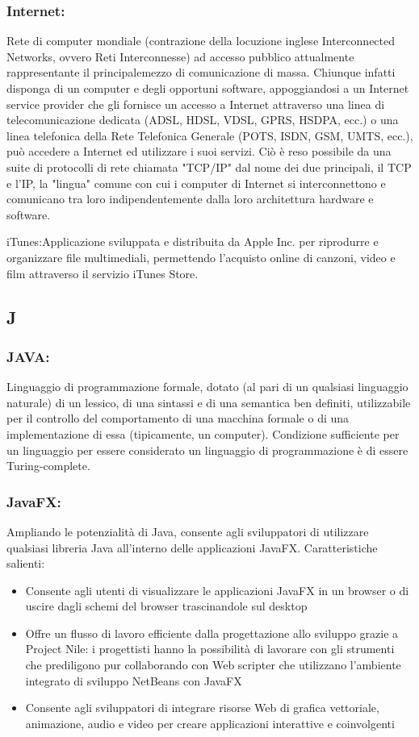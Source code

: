 \subsubsection*{Internet:}  Rete di computer mondiale (contrazione della
locuzione inglese Interconnected Networks, ovvero Reti Interconnesse) ad accesso pubblico
attualmente rappresentante il principalemezzo di comunicazione di massa.
Chiunque infatti disponga di un computer e degli opportuni software,
appoggiandosi a un Internet service provider che gli fornisce un accesso a
Internet attraverso una linea di telecomunicazione dedicata (ADSL, HDSL, VDSL,
GPRS, HSDPA, ecc.) o una linea telefonica della Rete Telefonica Generale (POTS,
ISDN, GSM, UMTS, ecc.), pu\`o accedere a Internet ed utilizzare i suoi servizi.
Ci\`o \`e reso possibile da una suite di protocolli di rete chiamata "TCP/IP" dal
nome dei due principali, il TCP e l'IP, la "lingua" comune con cui i computer di
Internet si interconnettono e comunicano tra loro indipendentemente dalla loro
architettura hardware e software.

iTunes:Applicazione sviluppata e distribuita da Apple Inc. per riprodurre e
organizzare file multimediali, permettendo l'acquisto online di canzoni, video e
film attraverso il servizio iTunes Store.

\subsection*{\huge{J}}
\subsubsection*{JAVA:} Linguaggio di programmazione formale, dotato (al pari di
un qualsiasi linguaggio naturale) di un lessico, di una sintassi e di una semantica ben
definiti, utilizzabile per il controllo del comportamento di una macchina
formale o di una implementazione di essa (tipicamente, un computer). Condizione
sufficiente per un linguaggio per essere considerato un linguaggio di
programmazione \`e di essere Turing-complete.

\subsubsection*{JavaFX:} Ampliando le potenzialit\`a di Java, consente agli
sviluppatori di utilizzare qualsiasi libreria Java all'interno delle applicazioni JavaFX.
Caratteristiche salienti:
\begin{itemize}
\item Consente agli utenti di visualizzare le applicazioni JavaFX in un browser
o di uscire dagli schemi del browser trascinandole sul desktop 
\item Offre un flusso di lavoro efficiente dalla progettazione allo sviluppo
grazie a Project Nile: i progettisti hanno la possibilit\`a di lavorare con gli strumenti
che prediligono pur collaborando con Web scripter che utilizzano l'ambiente
integrato di sviluppo NetBeans con JavaFX
\item Consente agli sviluppatori di integrare risorse Web di grafica vettoriale,
animazione, audio e video per creare applicazioni interattive e coinvolgenti
\end{itemize}


